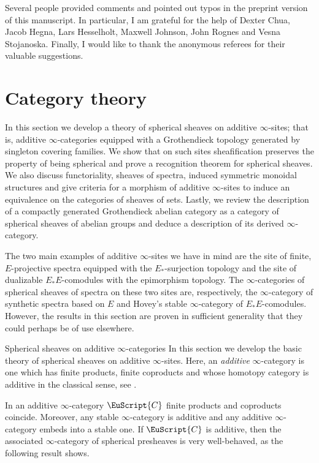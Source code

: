 \documentclass[oneside,a4paper]{amsart}
\makeatletter
\newcommand{\euscr}[1]{\EuScript{#1}} %
\newcommand{\ccat}{\euscr{C}} %
\theoremstyle{plain}
\theoremstyle{definition}
\theoremstyle{remark}
\def\subsection{\@startsection{subsection}{1}%
  \z@{.7\linespacing\@plus\linespacing}{.5\linespacing}%
  {\normalfont\bfseries\centering}}%
\makeatother
\begin{document}
Several people provided comments and pointed out typos in the preprint version of this manuscript. In particular, I am grateful for the help of Dexter Chua, Jacob Hegna, Lars Hesselholt, Maxwell Johnson, John Rognes and Vesna Stojanoska. Finally, I would like to thank the anonymous referees for their valuable suggestions. 

\section{Category theory}
\label{section:cat_theory}

In this section we develop a theory of spherical sheaves on additive $\infty$-sites; that is, additive $\infty$-categories equipped with a Grothendieck topology generated by singleton covering families. We show that on such sites sheafification preserves the property of being spherical and prove a recognition theorem for spherical sheaves. We also discuss functoriality, sheaves of spectra, induced symmetric monoidal structures and give criteria for a morphism of additive $\infty$-sites to induce an equivalence on the categories of sheaves of sets. Lastly, we review the description of a compactly generated Grothendieck abelian category as a category of spherical sheaves of abelian groups and deduce a description of its derived $\infty$-category. 

The two main examples of additive $\infty$-sites we have in mind are the site of finite, $E$-projective spectra equipped with the $E_{*}$-surjection topology and the site of dualizable $E_{*}E$-comodules with the epimorphism topology. The $\infty$-categories of spherical sheaves of spectra on these two sites are, respectively, the $\infty$-category of synthetic spectra based on $E$ and Hovey's stable $\infty$-category of $E_{*}E$-comodules. However, the results in this section are proven in sufficient generality that they could perhaps be of use elsewhere. 

\subsection{Spherical sheaves on additive $\infty$-categories}
In this section we develop the basic theory of spherical sheaves on additive $\infty$-sites. Here, an \emph{additive} $\infty$-category is one which has finite products, finite coproducts and whose homotopy category is additive in the classical sense, see \cite[\S C.1.5]{lurie_spectral_algebraic_geometry}.

In an additive $\infty$-category $\ccat$ finite products and coproducts coincide. Moreover, any stable $\infty$-category is additive and any additive $\infty$-category embeds into a stable one. If $\ccat$ is additive, then the associated $\infty$-category of spherical presheaves is very well-behaved, as the following result shows. 
\end{document}
